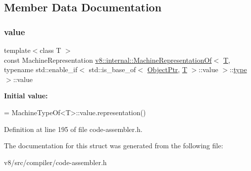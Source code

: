 \subsection{Member Data Documentation}
\mbox{\label{structv8_1_1internal_1_1MachineRepresentationOf_3_01T_00_01typename_01std_1_1enable__if_3_01std_63dc9825ccfede57893e0c8dd48ca7f9_af4ee6699c522b392db654b181ed87542}} 
\subsubsection{\texorpdfstring{value}{value}}
{\footnotesize\ttfamily template$<$class T $>$ \\
const Machine\+Representation \mbox{\hyperlink{structv8_1_1internal_1_1MachineRepresentationOf}{v8\+::internal\+::\+Machine\+Representation\+Of}}$<$ \mbox{\hyperlink{classv8_1_1internal_1_1torque_1_1T}{T}}, typename std\+::enable\+\_\+if$<$ std\+::is\+\_\+base\+\_\+of$<$ \mbox{\hyperlink{classv8_1_1internal_1_1ObjectPtr}{Object\+Ptr}}, \mbox{\hyperlink{classv8_1_1internal_1_1torque_1_1T}{T}} $>$\+::value $>$\+::\mbox{\hyperlink{classstd_1_1conditional_1_1type}{type}} $>$\+::value\hspace{0.3cm}{\ttfamily [static]}}

{\bfseries Initial value\+:}
\begin{DoxyCode}
=
      MachineTypeOf<T>::value.representation()
\end{DoxyCode}


Definition at line 195 of file code-\/assembler.\+h.



The documentation for this struct was generated from the following file\+:\begin{DoxyCompactItemize}
\item 
v8/src/compiler/code-\/assembler.\+h\end{DoxyCompactItemize}
